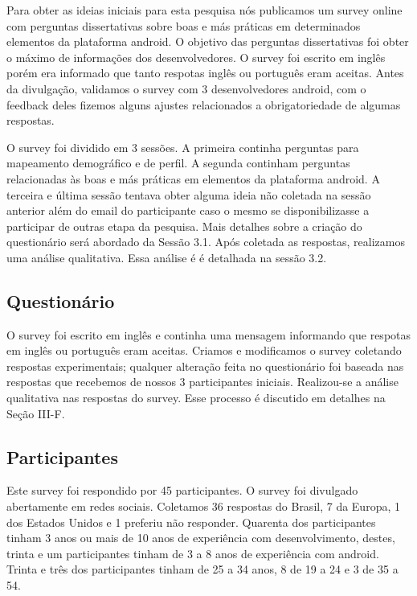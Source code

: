 Para obter as ideias iniciais para esta pesquisa n\'os publicamos um survey online com perguntas dissertativas sobre boas e m\'as pr\'aticas em determinados elementos da plataforma android. O objetivo das perguntas dissertativas foi obter o m\'aximo de informa\c{c}\~oes dos desenvolvedores. O survey foi escrito em ingl\^es por\'em era informado que tanto respotas ingl\^es ou portugu\^es eram aceitas. Antes da divulga\c{c}\~ao, validamos o survey com 3 desenvolvedores android, com o feedback deles fizemos alguns ajustes relacionados a obrigatoriedade de algumas respostas. 

O survey foi dividido em 3 sess\~oes. A primeira continha perguntas para mapeamento demogr\'afico e de perfil. A segunda continham perguntas relacionadas às boas e m\'as pr\'aticas em elementos da plataforma android. A terceira e \'ultima sess\~ao tentava obter alguma ideia n\~ao coletada na sess\~ao anterior al\'em do email do participante caso o mesmo se disponibilizasse a participar de outras etapa da pesquisa. Mais detalhes sobre a cria\c{c}\~ao do question\'ario ser\'a abordado da Sess\~ao 3.1. Ap\'os coletada as respostas, realizamos uma an\'alise qualitativa. Essa an\'alise \'e \'e detalhada na sess\~ao 3.2.

\subsection{Question\'ario}

O survey foi escrito em ingl\^es e continha uma mensagem informando que respotas em ingl\^es ou portugu\^es eram aceitas. Criamos e modificamos o survey coletando respostas experimentais; qualquer altera\c{c}\~ao feita no question\'ario foi baseada nas respostas que recebemos de nossos 3 participantes iniciais. Realizou-se a an\'alise qualitativa nas respostas do survey. Esse processo \'e discutido em detalhes na Se\c{c}\~ao III-F.

\subsection{Participantes}

Este survey foi respondido por 45 participantes. O survey foi divulgado abertamente em redes sociais. Coletamos 36 respostas do Brasil, 7 da Europa, 1 dos Estados Unidos e 1 preferiu n\~ao responder. Quarenta dos participantes tinham 3 anos ou mais de 10 anos de experi\^encia com desenvolvimento, destes, trinta e um participantes tinham de 3 a 8 anos de experi\^encia com android. Trinta e tr\^es dos participantes tinham de 25 a 34 anos, 8 de 19 a 24 e 3 de 35 a 54.

